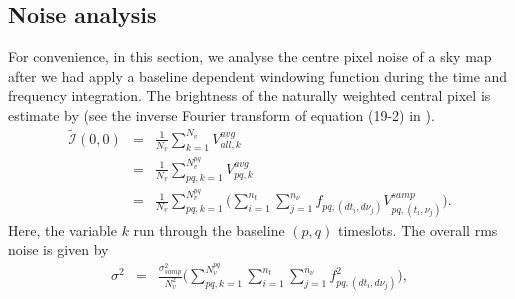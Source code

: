 \documentclass[useAMS,usenatbib]{mn2e}
\begin{document}
\subsection{Noise  analysis}
For convenience, in this section, we  analyse the centre pixel noise of a sky map after we had apply a baseline dependent windowing 
function during the time and frequency integration. The brightness of the 
naturally weighted central pixel is estimate by (see the inverse Fourier transform of equation (19-2) in 
\cite{1} ).
\begin{eqnarray*}
\widetilde{\mathcal{I}}(0,0)&=&\frac{1}{N_{v}}   \sum_{k=1}^{N_{v}} V_{all,k}^{avg}\\
	          &=&\frac{1}{N_{v}}   \sum_{pq,k=1}^{N_{v}^{pq}} V_{pq,k}^{avg}\\
	          &=&\frac{1}{N_{v}}   \sum_{pq,k=1}^{N_{v}^{pq}}\Big(\sum_{i=1}^{n_t}\sum_{j=1}^{n_{\nu}} 
f_{pq,(dt_i,d\nu_j)}V_{pq,(t_i,\nu_j)}^{samp}\Big).
\end{eqnarray*}
Here, the variable $k$ run through the baseline $(p,q)$ timeslots. The  overall rms noise is given by
\begin{eqnarray*}
\sigma^2	&=& 
\frac{\sigma^{2}_{samp} }{N_{v}^{2}}\Big(\sum_{pq,k=1}^{N_{v}^{pq}}\sum_{i=1}^{n_t}\sum_{j=1}^{n_{\nu}}f_{pq,(dt_i,d\nu_j)}^{2}\Big) ,
\end{eqnarray*}
\end{document}
